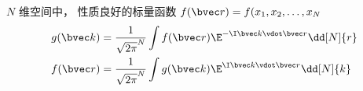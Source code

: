 
\begin{issues}
\issueDraft
\end{issues}


$N$ 维空间中， 性质良好的标量函数 $f(\bvec r) = f(x_1, x_2, \dots, x_N$
\begin{align}
g(\bvec k) &= \frac{1}{\sqrt{2\pi}^N} \int f(\bvec r) \E^{-\I \bvec k \vdot \bvec r} \dd[N]{r}\\
f(\bvec r) &= \frac{1}{\sqrt{2\pi}^N} \int g(\bvec k) \E^{\I \bvec k \vdot \bvec r} \dd[N]{k}
\end{align}

